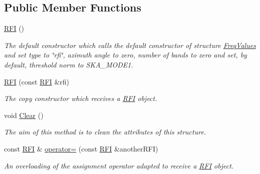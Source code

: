 \subsection*{Public Member Functions}
\begin{DoxyCompactItemize}
\item 
\mbox{\label{structRFI_ad0183cf1bc28c3f907e16428a5816e35}} 
\hyperlink{structRFI_ad0183cf1bc28c3f907e16428a5816e35}{R\+FI} ()
\begin{DoxyCompactList}\small\item\em The default constructor which calls the default constructor of structure {\itshape \hyperlink{structFreqValues}{Freq\+Values}} and set type to \char`\"{}rfi\char`\"{}, azimuth angle to zero, number of bands to zero and set, by default, threshold norm to S\+K\+A\+\_\+\+M\+O\+D\+E1. \end{DoxyCompactList}\item 
\mbox{\label{structRFI_a82852dbeab11484c90d4b339f63aefa9}} 
\hyperlink{structRFI_a82852dbeab11484c90d4b339f63aefa9}{R\+FI} (const \hyperlink{structRFI}{R\+FI} \&rfi)
\begin{DoxyCompactList}\small\item\em The copy constructor which receives a {\itshape \hyperlink{structRFI}{R\+FI}} object. \end{DoxyCompactList}\item 
\mbox{\label{structRFI_a103d0419053a7e323647cdafb3b036e3}} 
void \hyperlink{structRFI_a103d0419053a7e323647cdafb3b036e3}{Clear} ()
\begin{DoxyCompactList}\small\item\em The aim of this method is to clean the attributes of this structure. \end{DoxyCompactList}\item 
\mbox{\label{structRFI_a8fcc866a09f2f88a9754e04a1d056104}} 
const \hyperlink{structRFI}{R\+FI} \& \hyperlink{structRFI_a8fcc866a09f2f88a9754e04a1d056104}{operator=} (const \hyperlink{structRFI}{R\+FI} \&another\+R\+FI)
\begin{DoxyCompactList}\small\item\em An overloading of the assignment operator adapted to receive a {\itshape \hyperlink{structRFI}{R\+FI}} object. \end{DoxyCompactList}\end{DoxyCompactItemize}
